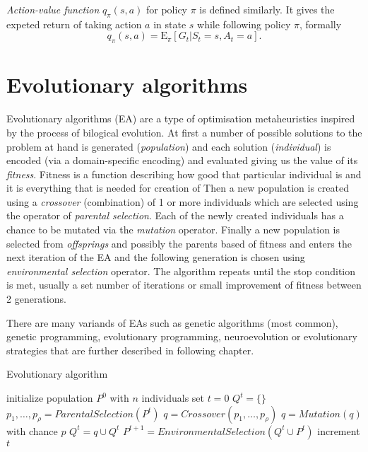 \emph{Action-value function} $q_\pi(s,a)$ for policy $\pi$ is defined similarly. It gives the expeted return of taking action $a$ in state $s$ while following policy $\pi$, formally
\begin{equation}
    q_\pi(s,a) = \mathrm{E}_\pi[G_t|S_t=s, A_t=a].
\end{equation}
\cite{Sutton1998}


\section{Evolutionary algorithms}
\label{sec:ea}
Evolutionary algorithms (EA) are a type of optimisation metaheuristics inspired by the process of bilogical evolution. At first a number of possible solutions to the problem at hand is generated (\emph{population}) and each solution (\emph{individual}) is encoded (via a domain-specific encoding) and evaluated giving us the value of its \emph{fitness}. Fitness is a function describing how good that particular individual is and it is everything that is needed for creation of  Then a new population is created using a \emph{crossover} (combination) of 1 or more individuals which are selected using the operator of \emph{parental selection}. Each of the newly created individuals has a chance to be mutated via the \emph{mutation} operator. Finally a new population is selected from \emph{offsprings} and possibly the parents based of fitness and enters the next iteration of the EA and the following generation is chosen using \emph{environmental selection} operator. The algorithm repeats until the stop condition is met, usually a set number of iterations or small improvement of fitness between 2 generations. 

There are many variands of EAs such as genetic algorithms (most common), genetic programming, evolutionary programming, neuroevolution or evolutionary strategies that are further described in following chapter. \cite{Rudolph2012} \cite{Vikhar2016}

\begin{algorithm}
    \begin{algorithmic}[1]
    \caption{Evolutionary algorithm}\label{alg:ea}
        \State initialize population $P^0$ with $n$ individuals
        \State set $t=0$
        \Repeat
            \State $Q^t = \{\}$
                \State $p_1,\dots,p_\rho = ParentalSelection(P^t)$
                \State $q = Crossover(p_1,\dots,p_\rho)$ 
                \State $q = Mutation(q)$ with chance $p$
                \State $Q^t = q \cup Q^t$
            \EndFor
            \State $P^{t+1} =EnvironmentalSelection(Q^t\cup  P^t)$
            \State increment $t$
    \end{algorithmic}
    \end{algorithm}

